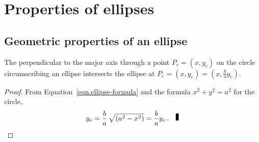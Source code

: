 

\chapter{Properties of ellipses}\label{s.ellipse}

\section{Geometric properties of an ellipse}

\begin{theorem}\label{thm.ellipse-b-over-a}
The perpendicular to the major axis through a point $P_c=(x,y_c)$ on the circle circumscribing an ellipse intersects the ellipse at $P_e=(x,y_e)=\left(x,\displaystyle\frac{b}{a}y_c\right)$.
\end{theorem}
\begin{proof} From Equation~\ref{eqn.ellipse-formula} and the formula $x^2+y^2=a^2$ for the circle,
\begin{equation}
y_e= \frac{b}{a} \,\sqrt{(a^2-x^2)}=\frac{b}{a}y_c\,.\label{eq.ye}\fqed
\end{equation}
\end{proof}


